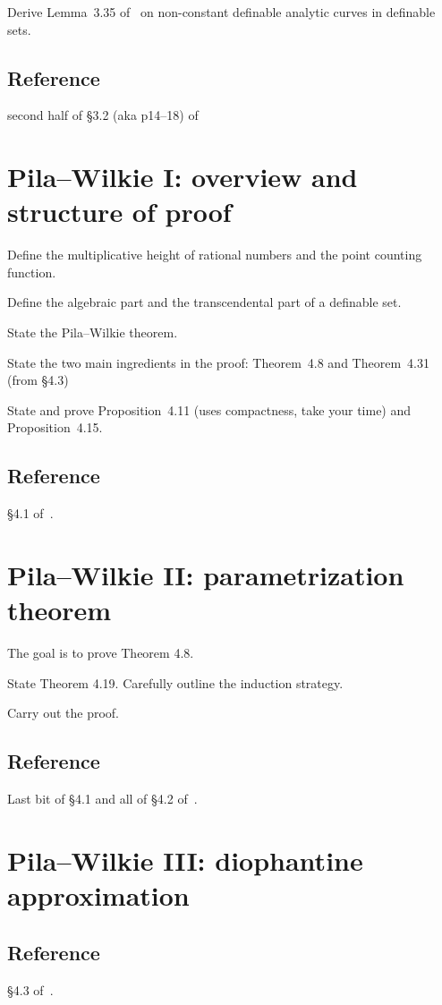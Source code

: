 \documentclass[10pt, a4paper]{amsart}
\begin{document}
Derive Lemma~3.35 of~\cite{scanlon} on non-constant definable analytic curves
in definable sets.

\subsection*{Reference} second half of \S3.2 (aka p14--18) of~\cite{scanlon}

\section{Pila--Wilkie I: overview and structure of proof}

Define the multiplicative height of rational numbers and the point counting function.

Define the algebraic part and the transcendental part of a definable set.

State the Pila--Wilkie theorem.

State the two main ingredients in the proof:
Theorem~4.8 and Theorem~4.31 (from \S4.3)

State and prove Proposition~4.11 (uses compactness, take your time) and Proposition~4.15.

\subsection*{Reference} \S4.1 of~\cite{scanlon}.

\section{Pila--Wilkie II: parametrization theorem}

The goal is to prove Theorem 4.8.

State Theorem 4.19. Carefully outline the induction strategy.

Carry out the proof.

\subsection*{Reference} Last bit of \S4.1 and all of \S4.2 of~\cite{scanlon}.

\section{Pila--Wilkie III: diophantine approximation}

\subsection*{Reference} \S4.3 of~\cite{scanlon}.
\end{document}
